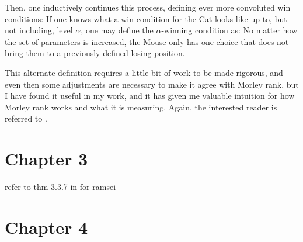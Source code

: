 \documentclass{article}
\theoremstyle{nonumberplain}
\begin{document}
Then, one inductively continues this process, defining ever more convoluted win conditions: If one knows what a win condition for the Cat looks like up to, but not including, level $\alpha$, one may define the $\alpha$-winning condition as: No matter how the set of parameters is increased, the Mouse only has one choice that does not bring them to a previously defined losing position.

This alternate definition requires a little bit of work to be made rigorous, and even then some adjustments are necessary to make it agree with Morley rank, but I have found it useful in my work, and it has given me valuable intuition for how Morley rank works and what it is measuring. Again, the interested reader is referred to \cite{myself_morley_rank}.

\section{Chapter 3}\label{sec:ch3}


refer to thm 3.3.7 in \cite{cnk} for ramsei

\section{Chapter 4}\label{sec:ch4}




\end{document}
